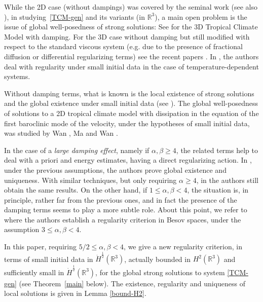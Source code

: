 \documentclass[a4paper]{article}
\newcommand{\R}{\mathbb{R}}
\begin{document}
While the 2D case (without dampings) was covered by the seminal work  \cite{Li-Titi} (see also \cite{Bis-2021, 
Dong-2020, Dong-Wu-2019, Li-Zhai-Yin, Ma-Wan, Niu, Wan, Ye}), in studying~\eqref{TCM-gen} and its variants (in $\mathbb{R}^3$), a main open problem
is the issue of global well-posedness of strong solutions: See \cite{BBC-JMAA, Yuan-Chen, Yuan-Zhang} for the 3D Tropical Climate
Model with damping. For the 3D case without damping but still modified with respect 
to the standard viscous system (e.g. due to the presence of fractional diffusion or differential regularizing terms)
see the recent papers \cite{BBC-AA, Chen-Yuan-Zhang, Zhang-Xu, Zhu}. In \cite{Ye-Zhu}, the authors deal with 
regularity under small initial data in the case of temperature-dependent systems.


Without damping terms, what is known is the local existence of strong
solutions \cite{Ma-Jiang-Wan} and {the global existence} under
small initial data (see \cite{Wang-Zhang-Pan, Zhang-Xu}). The global well-posedness of
solutions to a 2D tropical climate model with dissipation in the
equation of the first baroclinic mode of the velocity, under the
hypotheses of small initial data, was studied by Wan \cite{Wan}, Ma
and Wan \cite{Ma-Wan}.

In the case of a \emph{large damping effect}, namely if $\alpha, \beta \ge 4$, the related
terms help to deal with a priori and energy estimates, having a direct
regularizing action.  In \cite{Yuan-Zhang}, under the previous
assumptions, the authors prove global existence and
uniqueness. With similar techniques, but only requiring
$\alpha \geq 4$, in \cite{Yuan-Chen} the authors still obtain the same
results. On the other hand, if $1\leq \alpha, \beta < 4$,
the situation is, in principle, rather far from the previous ones, and
in fact the presence of the damping terms seems to play a more subtle
role. About this point, we refer to \cite{BBC-JMAA} where
the authors establish a regularity criterion in Besov spaces,
under the assumption $3\le \alpha, \beta <4$.

  In this paper, requiring $5/2\leq \alpha, \beta < 4$, we give a new
   regularity criterion, in terms of small initial data in
   $\dot H^{\frac{1}{2}}(\R^3)$, actually bounded in
   $H^2(\mathbb{R}^3)$ and sufficiently small in
   $\dot H^{\frac{1}{2}}(\R^3)$, for the global strong solutions to
   system \eqref{TCM-gen} (see Theorem~\ref{main} below). The existence,
   regularity and uniqueness of local solutions is given in Lemma
   \ref{bound-H2}.
    
\end{document}
